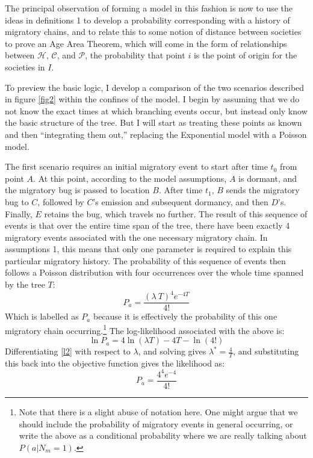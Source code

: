 \documentclass[11pt]{article}
\begin{document}
The principal observation of forming a model in this fashion is now to use the ideas in definitions 1 to develop a probability corresponding with a history of migratory chains, and to relate this to some notion of distance between societies to prove an Age Area Theorem, which will come in the form of relationships between $\mathcal{H}$, $\mathcal{C}$, and $\mathcal{P}$, the probability that point $i$ is the point of origin for the societies in $I$. 

To preview the basic logic, I  develop a comparison of the two scenarios described in figure \ref{fig2} within the confines of the model. I begin by assuming that we do not know the exact times at which branching events occur, but instead only know the basic structure of the tree. But I will start as treating these points as known and then ``integrating them out,'' replacing the Exponential model with a Poisson model. 

The first scenario requires an initial migratory event to start after time $t_0$ from point $A$. At this point, according to the model assumptions, $A$ is dormant, and the migratory bug is passed to location $B$. After time $t_1$, $B$ sends the migratory bug to $C$, followed by $C$'s emission and subsequent dormancy, and then $D$'s. Finally, $E$ retains the bug, which travels no further. The result of this sequence of events is that over the entire time span of the tree, there have been exactly 4 migratory events associated with the one necessary migratory chain. In assumptions 1, this means that only one parameter is required to explain this particular migratory history. The probability of this sequence of events then follows a Poisson distribution with four occurrences over the whole time spanned by the tree $T$:
\begin{equation} \label{l1}
P_a = \frac{(\lambda\ T)^4
e^{-4T}}{4!}\end{equation} 
Which is labelled as $P_a$ because it is effectively the probability of this one migratory chain occurring.\footnote{Note that there is a slight abuse of notation here. One might argue that we should include the probability of migratory events in general occurring, or write the above as a conditional probability where we are really talking about $P(a|N_m=1)$.} The log-likelihood associated with the above is:
\begin{equation} \label{l2}
\ln P_a  = 4\ln(\lambda T) -4T-\ln(4!)
\end{equation} 
Differentiating \ref{l2} with respect to $\lambda$, and solving gives $\lambda^*=\frac{4}{T}$, and substituting this back into the objective function gives the likelihood as:
\begin{equation}  \label{l3}
P_a=\frac{4^4e^{-4}}{4!}
\end{equation}
\end{document}
